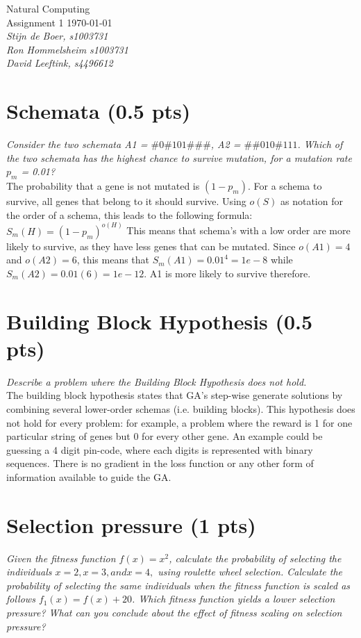 \documentclass{article}
\date{\today}
\begin{document}
\begin{flushright}
Natural Computing \\ 
Assignment 1 \today \\ 
\emph{Stijn de Boer, \textit{s1003731} \\ Ron Hommelsheim \textit{s1003731} \\  David Leeftink, \textit{s4496612} }\\\end{flushright}

\section{Schemata (0.5 pts)}
\textit{Consider the two schemata A1 = $\#0\#101\#\#\#$, A2 =
$\#\#010\#111$. Which of the two schemata has the highest chance to survive mutation, for a mutation rate $p_m$ = 0.01?} \\ 

The probability that a gene is not mutated is $(1-p_m)$. For a schema to survive, all genes that belong to it should survive. Using $o(S)$ as notation for the order of a schema, this leads to the following formula: $S_m(H)=(1-p_m)^{o(H)}$
This means that schema's with a low order are more likely to survive, as they have less genes that can be mutated.
Since $o(A1)=4$ and $o(A2)=6$, this means that $S_m(A1)=0.01^{4}=1e-8$ while $S_m(A2)=0.01(6)=1e-12$. A1 is more likely to survive therefore.


\section{Building Block Hypothesis (0.5 pts)}
\textit{Describe a problem where the Building Block Hypothesis does not hold.} \\

The building block hypothesis states that GA's step-wise generate solutions by combining several lower-order schemas (i.e. building blocks). This hypothesis does not hold for every problem: for example, a problem where the reward is 1 for one particular string of genes but 0 for every other gene. An example could be guessing a 4 digit pin-code, where each digits is represented with binary sequences. There is no gradient in the loss function or any other form of information available to guide the GA.

\section{Selection pressure (1 pts)}
\textit{Given the fitness function $f(x) = x^2$, calculate the probability of selecting the individuals $x = 2, x = 3, and x = 4,$ using roulette wheel selection. Calculate the probability of selecting the same individuals when the fitness function is scaled as follows $f_1 (x) = f (x) + 20$. Which fitness function yields a lower selection pressure? What can you conclude about the effect of fitness scaling on selection pressure?} \\ 
\end{document}

